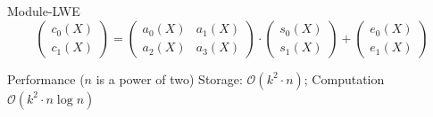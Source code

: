 \documentclass[xcolor=table,10pt,aspectratio=169]{beamer}
\begin{document}
\begin{frame}[label={sec:orge473c59}]{Module-LWE}
\[
\begin{pmatrix} c_{0}(X) \\ c_{1}(X) \end{pmatrix} =
\begin{pmatrix} a_{0}(X) & a_{1}(X) \\ a_{2}(X) & a_{3}(X) \end{pmatrix} \cdot
\begin{pmatrix} s_{0}(X) \\ s_{1}(X) \end{pmatrix} +
\begin{pmatrix} e_{0}(X) \\ e_{1}(X) \end{pmatrix}
\]
\begin{block}{Performance (\(n\) is a power of two)}
Storage: \(\mathcal{O}(k^{2} \cdot n)\); Computation \(\mathcal{O}(k^{2} \cdot n \log n)\)
\end{block}
{\footnotesize {} \par}
\end{frame}
\end{document}
